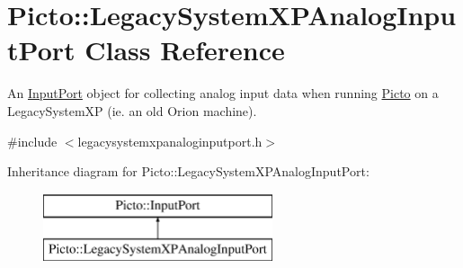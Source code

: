 \hypertarget{class_picto_1_1_legacy_system_x_p_analog_input_port}{\section{Picto\-:\-:Legacy\-System\-X\-P\-Analog\-Input\-Port Class Reference}
\label{class_picto_1_1_legacy_system_x_p_analog_input_port}
}


An \hyperlink{class_picto_1_1_input_port}{Input\-Port} object for collecting analog input data when running \hyperlink{namespace_picto}{Picto} on a Legacy\-System\-X\-P (ie. an old Orion machine).  




{\ttfamily \#include $<$legacysystemxpanaloginputport.\-h$>$}

Inheritance diagram for Picto\-:\-:Legacy\-System\-X\-P\-Analog\-Input\-Port\-:\begin{figure}[H]
\begin{center}
\leavevmode
\includegraphics[height=2.000000cm]{class_picto_1_1_legacy_system_x_p_analog_input_port}
\end{center}
\end{figure}
